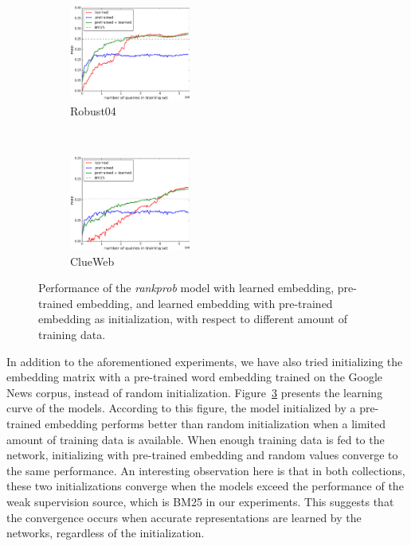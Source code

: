 \documentclass[sigconf]{acmart}
\newcommand{\modelthree}{\textit{rank\-prob} model\xspace}
\begin{document}
\begin{figure}[t]
    \centering
    \begin{subfigure}[t]{0.24\textwidth}
        \centering
        \includegraphics[height=3.1cm]{Images/em_R}
        \caption{\label{fig:embedding_r}Robust04\vspace*{-3ex}}
    \end{subfigure}%
    ~
    \begin{subfigure}[t]{0.24\textwidth}
        \centering
        \includegraphics[height=3.1cm]{Images/em_C}
        \caption{\label{fig:embedding_c}ClueWeb\vspace*{-3ex}}
    \end{subfigure}%
    \caption{\label{fig:embedding}Performance of the \modelthree with learned embedding, pre-trained embedding, and learned embedding with pre-trained embedding as initialization, with respect to different amount of training data.}
    \vspace{-10pt}
\end{figure}



In addition to the aforementioned experiments, we have also tried initializing the embedding matrix with a pre-trained word embedding trained on the Google News corpus, instead of random initialization.
%
Figure~\ref{fig:embedding} presents the learning curve of the models. According to this figure, the model initialized by a pre-trained embedding performs better than random initialization when a limited amount of training data is available. 
%
When enough training data is fed to the network, initializing with pre-trained embedding and random values converge to the same performance.
An interesting observation here is that in both collections, these two initializations converge when the models exceed the performance of the weak supervision source, which is BM25 in our experiments. 
This suggests that the convergence occurs when accurate representations are learned by the networks, regardless of the initialization.
\end{document}
